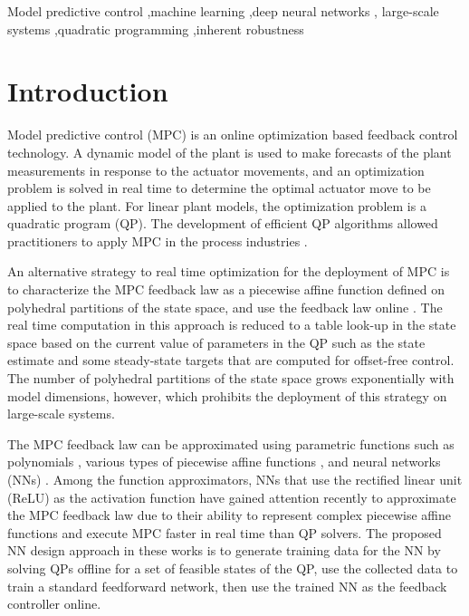 \documentclass[preprint,5p, twocolumn, authoryear]{elsarticle}
\begin{document}
\begin{frontmatter}
\begin{keyword}
Model predictive control \sep machine learning \sep deep neural networks \sep
large-scale systems \sep quadratic programming \sep inherent robustness
\end{keyword}

\end{frontmatter}

\section{Introduction} \label{sec:introduction}

Model predictive control (MPC) is an online optimization based feedback control
technology. A dynamic model of the plant is used to make forecasts of the plant
measurements in response to the actuator movements, and an optimization problem
is solved in real time to determine the optimal actuator move to be applied to
the plant. For linear plant models, the optimization problem is a quadratic
program (QP). The development of efficient QP algorithms
\citep{kouzoupis:frison:zanelli:diehl:2018, wright:2019} allowed practitioners
to apply MPC in the process industries \citep*{qin:badgwell:2003, lahiri:2017}.

An alternative strategy to real time optimization for the deployment of MPC is
to characterize the MPC feedback law as a piecewise affine function defined on
polyhedral partitions of the state space, and use the feedback law online
\citep{bemporad:morari:dua:pistikopoulos:2002, seron:goodwin:dedona:2003}. The
real time computation in this approach is reduced to a table look-up in the
state space based on the current value of parameters in the QP such as the state
estimate and some steady-state targets that are computed for offset-free
control. The number of polyhedral partitions of the state space grows
exponentially with model dimensions, however, which prohibits the deployment of
this strategy on large-scale systems.

The MPC feedback law can be approximated using parametric functions such as
polynomials \citep{kvasnica:lofberg:fikar:2011}, various types of piecewise
affine functions \citep{bemporad:oliveri:poggi:storace:2011,
wen:ma:ydstie:2009}, and neural networks (NNs)
\citep{cavagnari:magni:scattolini:1999}. Among the function approximators, NNs
that use the rectified linear unit (ReLU) as the activation function have gained
attention recently \citep{chen:saulnier:atanasov:lee:kumar:pappas:morari:2018,
karg:lucia:2020, paulson:mesbah:2020, lovelett:dietrich:lee:kevrekidis:2020} to
approximate the MPC feedback law due to their ability to represent complex
piecewise affine functions \citep{montufar:pascanu:cho:bengio:2014} and execute
MPC faster in real time than QP solvers. The proposed NN design approach in
these works is to generate training data for the NN by solving QPs offline for a
set of feasible states of the QP, use the collected data to train a standard
feedforward network, then use the trained NN as the feedback controller online.
\end{document}

